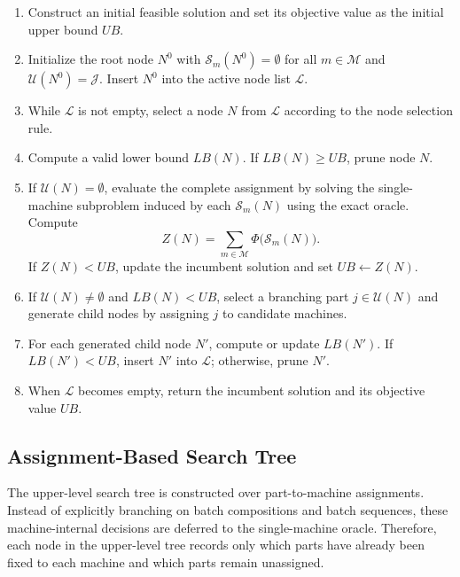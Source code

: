 \documentclass[review,3p,times,authoryear]{elsarticle}
\begin{document}
\begin{enumerate}
	\item Construct an initial feasible solution and set its objective value
	as the initial upper bound $UB$.
	
	\item Initialize the root node $N^0$ with
	$\mathcal{S}_m(N^0)=\emptyset$ for all $m\in\mathcal{M}$ and
	$\mathcal{U}(N^0)=\mathcal{J}$. Insert $N^0$ into the active node list
	$\mathcal{L}$.
	
	\item While $\mathcal{L}$ is not empty, select a node $N$ from
	$\mathcal{L}$ according to the node selection rule.
	
	\item Compute a valid lower bound $LB(N)$. If $LB(N)\ge UB$, prune
	node $N$.
	
	\item If $\mathcal{U}(N)=\emptyset$, evaluate the complete assignment by
	solving the single-machine subproblem induced by each
	$\mathcal{S}_m(N)$ using the exact oracle. Compute
	\[
	Z(N)=\sum_{m\in\mathcal{M}}\Phi\bigl(\mathcal{S}_m(N)\bigr).
	\]
	If $Z(N)<UB$, update the incumbent solution and set $UB\leftarrow Z(N)$.
	
	\item If $\mathcal{U}(N)\neq\emptyset$ and $LB(N)<UB$, select a
	branching part $j\in\mathcal{U}(N)$ and generate child nodes by assigning
	$j$ to candidate machines.
	
	\item For each generated child node $N'$, compute or update $LB(N')$.
	If $LB(N')<UB$, insert $N'$ into $\mathcal{L}$; otherwise, prune $N'$.
	
	\item When $\mathcal{L}$ becomes empty, return the incumbent solution
	and its objective value $UB$.
\end{enumerate}




\subsection{Assignment-Based Search Tree}
\label{subsec:assignment_tree}

The upper-level search tree is constructed over part-to-machine assignments.
Instead of explicitly branching on batch compositions and batch sequences,
these machine-internal decisions are deferred to the single-machine oracle.
Therefore, each node in the upper-level tree records only which parts have
already been fixed to each machine and which parts remain unassigned.
\end{document}
